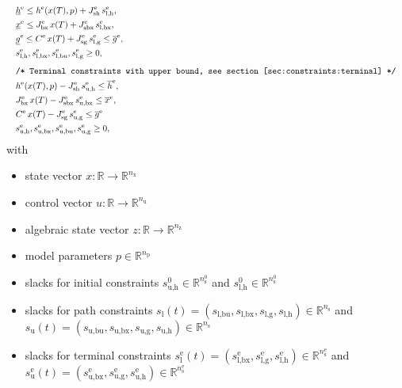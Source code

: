 \documentclass[english]{article}
\newcommand{\ind}[1]{_{\textrm{#1}}}
\newcommand{\terminal}{^{\textrm{e}}}
\newcommand{\initial}{^{\textrm{0}}}
\newcommand{\Lower}{\ind{l}}
\newcommand{\lowerh}{\ind{l,h}}
\newcommand{\lowerbx}{\ind{l,bx}}
\newcommand{\lowerbu}{\ind{l,bu}}
\newcommand{\lowerg}{\ind{l,g}}
\newcommand{\upper}{\ind{u}}
\newcommand{\upperh}{\ind{u,h}}
\newcommand{\upperbx}{\ind{u,bx}}
\newcommand{\upperbu}{\ind{u,bu}}
\newcommand{\upperg}{\ind{u,g}}
\newcommand{\mathComment}[1]{\texttt{/* #1 */}}
\newcommand{\R}{\mathbb{R}}
\newcommand{\nx}{n\ind{x}}
\newcommand{\nuu}{n\ind{u}}
\newcommand{\nz}{n\ind{z}}
\newcommand{\np}{n\ind{p}}
\newcommand{\ns}{n\ind{s}}
\begin{document}
\begin{align}
    &&&\underline{h}\terminal \leq h\terminal(x(T), p) + J\ind{sh}\terminal\, s\lowerh\terminal, &&\label{eq:constraints:terminal:lower_bounds:start}\\
    &&&\underline{x}\terminal \leq J_{\textrm{bx}}\terminal\, x(T) + J\ind{sbx}\terminal\, s\lowerbx\terminal, &&\\ %
    &&&\underline{g}\terminal \leq C\terminal\, x(T) + J\ind{sg}\terminal\, s\lowerg\terminal \leq \overline{g}\terminal, && \\
    &&& s\lowerh\terminal, s\lowerbx\terminal, s\lowerbu\terminal, s\lowerg\terminal \geq 0, \label{eq:constraints:terminal:lower_bounds:end}\\[1ex]
    &&&\mathComment{Terminal constraints with upper bound, see section \ref{sec:constraints:terminal}}\nonumber\\
    &&& h\terminal(x(T), p) - J\ind{sh}\terminal\, s\ind{u,h}\terminal \leq \overline{h}\terminal, &&\label{eq:constraints:terminal:upper_bounds:start}\\
    &&& J_{\textrm{bx}}\terminal\, x(T) - J\ind{sbx}\terminal\, s\ind{u,bx}\terminal \leq \overline{x}^{e}, &&\\ %
    &&& C\terminal\, x(T) - J\ind{sg}\terminal\, s\ind{u,g}\terminal \leq \overline{g}\terminal \\
    &&& s\upperh\terminal, s\upperbx\terminal, s\upperbu\terminal, s\upperg\terminal \geq 0,\label{eq:constraints:terminal:upper_bounds:end}
\end{align}
%
with
\begin{itemize}
\item state vector $ x: \R \rightarrow \R^{\nx} $
\item control vector $ u: \R \rightarrow \R^{\nuu} $
\item algebraic state vector $ z: \R \rightarrow \R^{\nz} $
\item model parameters $ p \in \R^{\np} $
\item slacks for initial constraints $s\ind{u,h}\initial \in \R^{\ns\initial}$ and $s\ind{l,h}\initial \in \R^{\ns\initial}$
\item slacks for path constraints $ s\Lower(t) = (s\lowerbu, s\lowerbx, s\lowerg, s\lowerh) \in \R^{\ns} $ and $ s\upper(t) = (s\upperbu, s\upperbx, s\upperg, s\upperh) \in \R^{\ns} $
\item slacks for terminal constraints $ s\Lower\terminal(t) = (s\lowerbx\terminal, s\lowerg\terminal, s\lowerh\terminal) \in \R^{\ns\terminal} $ and $ s\upper\terminal(t) = (s\upperbx\terminal, s\upperg\terminal, s\upperh\terminal) \in \R^{\ns\terminal} $
\end{itemize}
\end{document}

